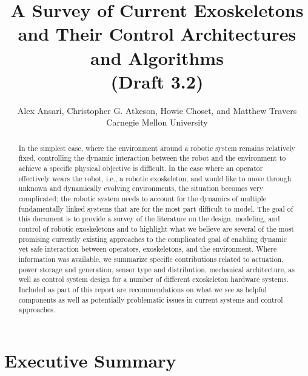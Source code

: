 \documentclass[letterpaper,12pt,fullpage]{article}
\begin{document}
\title{A Survey of Current Exoskeletons\\ and Their Control Architectures and
Algorithms\\
(Draft 3.2)}

\author{Alex Ansari, Christopher G. Atkeson, Howie Choset, and Matthew Travers\\
Carnegie Mellon University}

\maketitle

\begin{abstract}
In the simplest case, where the environment around a robotic system remains relatively fixed, controlling the dynamic interaction between the robot and the environment to achieve a specific physical objective is difficult.  In the case where an operator effectively wears the robot, i.e., a robotic exoskeleton, and would like to move through unknown and dynamically evolving environments, the situation becomes very complicated; the robotic system needs to account for the dynamics of multiple fundamentally linked systems that are for the most part difficult to model.  The goal of this document is to provide a survey of the literature on the design, modeling, and control of robotic exoskeletons and to highlight what we believe are several of the most promising currently existing approaches to the complicated goal of enabling dynamic yet safe interaction between operators, exoskeletons, and the environment.  Where information was available, we summarize specific contributions related to actuation, power storage and generation, sensor type and distribution, mechanical architecture, as well as control system design for a number of different exoskeleton hardware systems.  Included as part of this report are recommendations on what we see as helpful components as well as potentially problematic issues in current systems and control approaches. 
\end{abstract}

\section{Executive Summary}
\end{document}

